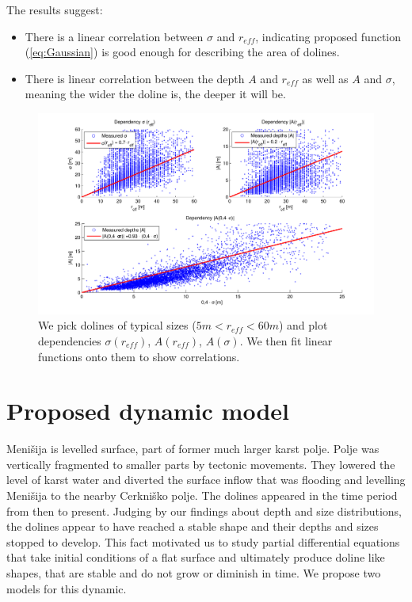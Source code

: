 \documentclass[a0,portrait]{a0poster}
\begin{document}
\begin{multicols}{2}
The results suggest:
\begin{itemize}
  \item There is a linear correlation between $\sigma$ and $r_{eff}$, indicating proposed function (\ref{eq:Gaussian}) is good enough for describing the area of dolines.
  \item There is linear correlation between the depth $A$ and $r_{eff}$ as well as $A$ and $\sigma$, meaning the wider the doline is, the deeper it will be.
\end{itemize}

\vspace{0.7cm}
  \begin{figure}[H]
    \centering
    \includegraphics[width=0.85\linewidth]{menisija-A-sigma-reff-2.pdf}
    \caption{We pick dolines of typical sizes ($5m < r_{eff} < 60m$) and plot dependencies $\sigma(r_{eff})$, $A(r_{eff})$, $A(\sigma)$. We then fit linear functions onto them to show correlations.}
    \label{fig:vrtace-fit}
  \end{figure}


\section*{Proposed dynamic model}

Menišija is levelled surface, part of former much larger karst polje. Polje was vertically fragmented to smaller parts by tectonic movements. They lowered the level of karst water and diverted the surface inflow that was flooding and levelling Menišija to the nearby Cerkniško polje. The dolines appeared in the time period from then to present. Judging by our findings about depth and size distributions, the dolines appear to have reached a stable shape and their depths and sizes stopped to develop.
This fact motivated us to study partial differential equations that take initial conditions of a flat surface and ultimately produce doline like shapes, that are stable and do not grow or diminish in time. We propose two models for this dynamic.


\end{multicols}
\end{document}
